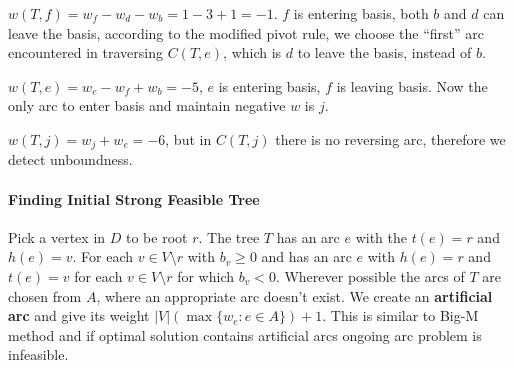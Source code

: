                 $w(T,f) = w_f - w_d - w_b = 1 - 3 + 1 = -1$. $f$ is entering basis, both $b$ and $d$ can leave the basis, according to the modified pivot rule, we choose the ``first'' arc encountered in traversing $C(T, e)$, which is $d$ to leave the basis, instead of $b$.

                \begin{figure}[H]
                    \centering
                \end{figure}

                $w(T, e) = w_e - w_f + w_b = -5$, $e$ is entering basis, $f$ is leaving basis. Now the only arc to enter basis and maintain negative $w$ is $j$.

                \begin{figure}[H]
                    \centering
                \end{figure}

                $w(T, j) = w_j + w_e = -6$, but in $C(T, j)$ there is no reversing arc, therefore we detect unboundness.

            \paragraph{Finding Initial Strong Feasible Tree}
                Pick a vertex in $D$ to be root $r$. The tree $T$ has an arc $e$ with the $t(e) = r$ and $h(e) = v$. For each $v\in V\setminus r$ with $b_v \ge 0$ and has an arc $e$ with $h(e) = r$ and $t(e) = v$ for each $v \in V\setminus r$ for which $b_v < 0$. Wherever possible the arcs of $T$ are chosen from $A$, where an appropriate arc doesn't exist. We create an \textbf{artificial arc} and give its weight $|V|(\max\{w_e: e\in A\}) + 1$. This is similar to Big-M method and if optimal solution contains artificial arcs ongoing arc problem is infeasible.

